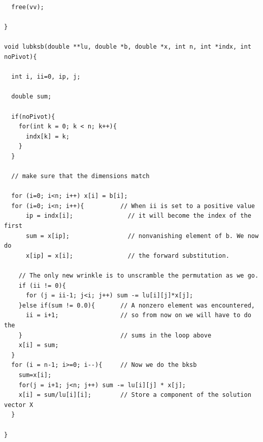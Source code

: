 \documentclass{article}
\begin{document}
\begin{verbatim}
  free(vv);

}

void lubksb(double **lu, double *b, double *x, int n, int *indx, int noPivot){

  int i, ii=0, ip, j;

  double sum;

  if(noPivot){
    for(int k = 0; k < n; k++){
      indx[k] = k;
    }
  }

  // make sure that the dimensions match

  for (i=0; i<n; i++) x[i] = b[i];
  for (i=0; i<n; i++){          // When ii is set to a positive value
      ip = indx[i];               // it will become the index of the first
      sum = x[ip];                // nonvanishing element of b. We now do
      x[ip] = x[i];               // the forward substitution.

    // The only new wrinkle is to unscramble the permutation as we go.
    if (ii != 0){
      for (j = ii-1; j<i; j++) sum -= lu[i][j]*x[j];
    }else if(sum != 0.0){       // A nonzero element was encountered,
      ii = i+1;                 // so from now on we will have to do the
    }                           // sums in the loop above
    x[i] = sum;
  }
  for (i = n-1; i>=0; i--){     // Now we do the bksb
    sum=x[i];
    for(j = i+1; j<n; j++) sum -= lu[i][j] * x[j];
    x[i] = sum/lu[i][i];        // Store a component of the solution vector X
  }

}
\end{verbatim}

\hline
\end{document}
